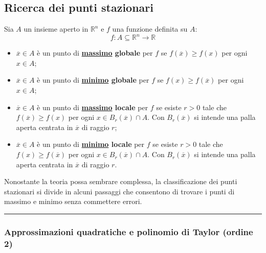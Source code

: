 \documentclass[a4paper]{article}
\newcommand{\longline}{\noindent\rule{\textwidth}{0.4pt}}
\newcommand{\definition}[1]{\textcolor{Red3}{\textbf{#1}}}
\begin{document}
	\subsection{Ricerca dei punti stazionari}\label{subsection: ricerca dei punti stazionari}

	Sia $A$ un  insieme aperto in $\mathbb{R}^{n}$ e $f$ una funzione definita su $A$:
	\begin{equation*}
		f: A \subseteq \mathbb{R}^{n} \rightarrow \mathbb{R}
	\end{equation*}
	\begin{boxdef}
		\begin{itemize}
			\item $\overline{x} \in A$ è un punto di \definition{\underline{massimo} globale} per $f$ se $f\left(\overline{x}\right) \ge f\left(x\right)$ per ogni $x \in A$;
			
			\item $\overline{x} \in A$ è un punto di \definition{\underline{minimo} globale} per $f$ se $f\left(x\right) \ge f\left(\overline{x}\right)$ per ogni $x \in A$;

			\item $\overline{x} \in A$ è un punto di \definition{\underline{massimo} locale} per $f$ se esiste $r > 0$ tale che $f\left(\overline{x}\right) \ge f\left(x\right)$ per ogni $x \in B_{r}\left(\overline{x}\right) \cap A$. Con $B_{r}\left(\overline{x}\right)$ si intende una palla aperta centrata in $\overline{x}$ di raggio $r$;

			\item $\overline{x} \in A$ è un punto di \definition{\underline{minimo} locale} per $f$ se esiste $r > 0$ tale che $f\left(x\right) \ge f\left(\overline{x}\right)$ per ogni $x \in B_{r}\left(\overline{x}\right) \cap A$. Con $B_{r}\left(\overline{x}\right)$ si intende una palla aperta centrata in $\overline{x}$ di raggio $r$.
		\end{itemize}
	\end{boxdef}

	\noindent
	Nonostante la teoria possa sembrare complessa, la classificazione dei punti stazionari si divide in alcuni passaggi che consentono di trovare i punti di massimo e minimo senza commettere errori.
	
	\longline

	\subsubsection{Approssimazioni quadratiche e polinomio di Taylor (ordine 2)}\label{subsubsection: approssimazioni quadratiche e polinomio di Taylor (ordine 2)}
\end{document}
